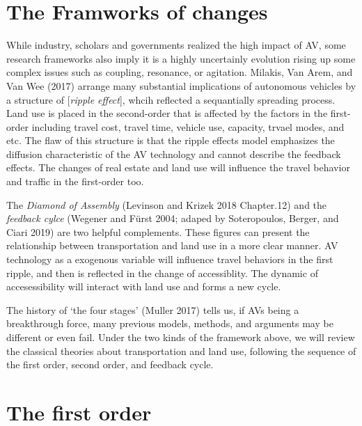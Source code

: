 \documentclass[12pt,]{article}
\begin{document}
\hypertarget{the-framworks-of-changes}{%
\section{The Framworks of changes}\label{the-framworks-of-changes}}

While industry, scholars and governments realized the high impact of AV,
some research frameworks also imply it is a highly uncertainly evolution
rising up some complex issues such as coupling, resonance, or agitation.
Milakis, Van Arem, and Van Wee (2017) arrange many substantial
implications of autonomous vehicles by a structure of {[}\emph{ripple
effect}{]}, whcih reflected a sequantially spreading process. Land use
is placed in the second-order that is affected by the factors in the
first-order including travel cost, travel time, vehicle use, capacity,
trvael modes, and etc. The flaw of this structure is that the ripple
effects model emphasizes the diffusion characteristic of the AV
technology and cannot describe the feedback effects. The changes of real
estate and land use will influence the travel behavior and traffic in
the first-order too.

The \emph{Diamond of Assembly} (Levinson and Krizek 2018 Chapter.12) and
the \emph{feedback cylce} (Wegener and Fürst 2004; adaped by
Soteropoulos, Berger, and Ciari 2019) are two helpful complements. These
figures can present the relationship between transportation and land use
in a more clear manner. AV technology as a exogenous variable will
influence travel behaviors in the first ripple, and then is reflected in
the change of accessiblity. The dynamic of accesessibility will interact
with land use and forms a new cycle.

The history of `the four stages' (Muller 2017) tells us, if AVs being a
breakthrough force, many previous models, methods, and arguments may be
different or even fail. Under the two kinds of the framework above, we
will review the classical theories about transportation and land use,
following the sequence of the first order, second order, and feedback
cycle.

\hypertarget{the-first-order}{%
\section{The first order}\label{the-first-order}}
\end{document}
